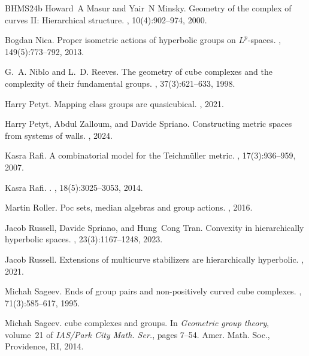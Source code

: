 \documentclass{amsart}
\theoremstyle{definition}
\theoremstyle{remark}
\theoremstyle{definition}
\begin{document}
\begin{thebibliography}{BHMS24b}
Howard~A Masur and Yair~N Minsky.
\newblock Geometry of the complex of curves {II}: Hierarchical structure.
, 10(4):902--974, 2000.

Bogdan Nica.
\newblock Proper isometric actions of hyperbolic groups on {$L^p$}-spaces.
, 149(5):773--792, 2013.

G.~A. Niblo and L.~D. Reeves.
\newblock The geometry of cube complexes and the complexity of their
  fundamental groups.
, 37(3):621--633, 1998.

Harry Petyt.
\newblock Mapping class groups are quasicubical.
, 2021.

Harry Petyt, Abdul Zalloum, and Davide Spriano.
\newblock Constructing metric spaces from systems of walls.
, 2024.

Kasra Rafi.
\newblock A combinatorial model for the {T}eichm\"{u}ller metric.
, 17(3):936--959, 2007.

Kasra Rafi.
.
, 18(5):3025--3053, 2014.

Martin Roller.
\newblock Poc sets, median algebras and group actions.
, 2016.

Jacob Russell, Davide Spriano, and Hung~Cong Tran.
\newblock Convexity in hierarchically hyperbolic spaces.
, 23(3):1167--1248, 2023.

Jacob Russell.
\newblock Extensions of multicurve stabilizers are hierarchically hyperbolic.
,
  2021.

Michah Sageev.
\newblock Ends of group pairs and non-positively curved cube complexes.
, 71(3):585--617, 1995.

Michah Sageev.
 cube complexes and groups.
\newblock In {\em Geometric group theory}, volume~21 of {\em IAS/Park City
  Math. Ser.}, pages 7--54. Amer. Math. Soc., Providence, RI, 2014.


\end{thebibliography}
\end{document}
